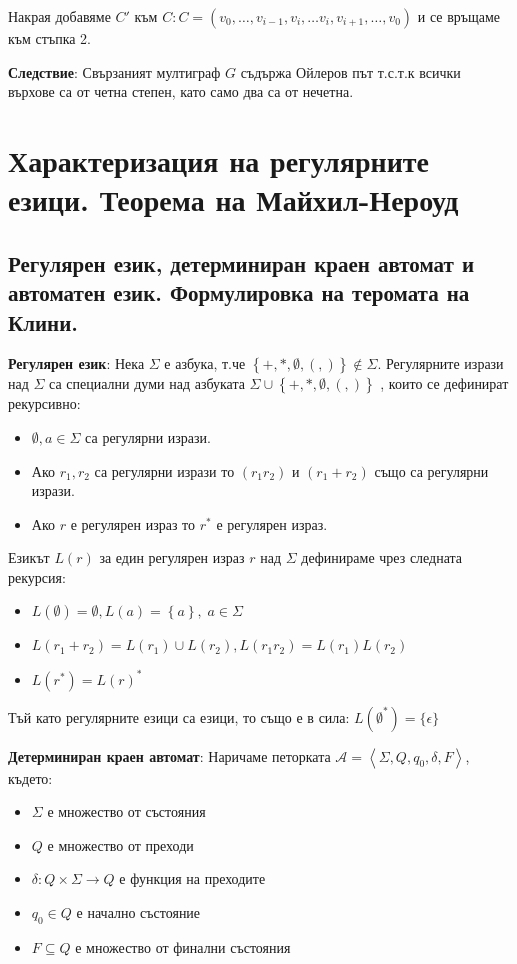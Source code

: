 \documentclass{article}
\renewcommand{\\}{\newline}
\begin{document}
            Накрая добавяме \(C'\) към \(C: C=(v_{0}, \dots, v_{i-1}, v_{i}, \dots v_{i}, v_{i+1}, \dots, v_{0})\) и се връщаме към стъпка 2.

      \textbf{Следствие}: Свързаният мултиграф \(G\) съдържа Ойлеров път т.с.т.к всички върхове са от четна степен, като само два са от нечетна. 

\newpage
\section{Характеризация на регулярните езици. Теорема на Майхил-Нероуд}
  \subsection{Регулярен език, детерминиран краен автомат и автоматен език. Формулировка на теромата на Клини.} 
    \textbf{Регулярен език}: Нека \(\Sigma\) е азбука, т.че \(\left\{+, *, \emptyset, (, )\right\} \not\in \Sigma\). Регулярните изрази над \(\Sigma\) са специални думи над азбуката \(\Sigma \cup \left\{+, *, \emptyset, (, )\right\}\) , които се дефинират рекурсивно:
    \begin{itemize}
        \item \(\emptyset, a \in \Sigma\) са регулярни изрази. 
        \item Ако \(r_1, r_2\) са регулярни изрази то \((r_{1}r_{2})\) и \((r_{1} + r_{2})\) също са регулярни изрази. 
        \item Ако \(r\) е регулярен израз то \(r^{*}\) е регулярен израз. 
    \end{itemize}

    Езикът \(L(r)\) за един регулярен израз \(r\) над \(\Sigma\) дефинираме чрез следната рекурсия:
    \begin{itemize}
        \item \(L(\emptyset) = \emptyset, L(a) = \left\{a\right\},\; a \in \Sigma\) 
        \item \(L(r_{1} + r_{2}) = L(r_{1}) \cup L(r_{2}), L(r_{1}r_{2}) = L(r_{1})L(r_{2})\)
        \item \(L({r^{*}}) = L(r)^{*}\)  
    \end{itemize}

    Тъй като регулярните езици са езици, то също е в сила: \(L(\emptyset^{*}) = \{\epsilon\}\)  

    \textbf{Детерминиран краен автомат}: Наричаме петорката \(\mathcal{A} = \left\langle  \Sigma, Q, q_0, \delta, F\right\rangle\), където:
    \begin{itemize}
        \item \(\Sigma\) е множество от състояния
        \item \(Q\) е множество от преходи
        \item \(\delta: Q \times \Sigma \to Q\) е функция на преходите 
        \item \(q_0 \in Q\) е начално състояние
        \item \(F \subseteq Q\) е множество от финални състояния 
    \end{itemize}
\end{document}
